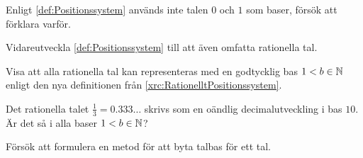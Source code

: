 \begin{exercise}\label{xrc:GiltigaTalbaser}
  Enligt \cref{def:Positionssystem} används inte talen \(0\) och \(1\)
  som baser, försök att förklara varför.
\end{exercise}
\begin{exercise}\label{xrc:RationelltPositionssystem}
  Vidareutveckla \cref{def:Positionssystem} till att även
  omfatta rationella tal.
\end{exercise}
\begin{exercise}\label{xrc:KomplettRationelltPositionssystem}
  Visa att alla rationella tal kan representeras med en godtycklig bas
  \(1<b\in\mathbb{N}\) enligt den nya definitionen från
  \cref{xrc:RationelltPositionssystem}.
\end{exercise}
\begin{exercise}\label{xrc:Decimalfoljder}
  Det rationella talet \(\frac{1}{3} = 0.333\ldots\) skrivs som en oändlig
  decimalutveckling i bas \(10\).
  Är det så i alla baser \(1<b\in\mathbb{N}\)?
\end{exercise}
\begin{exercise}\label{xrc:Basbyte}
  Försök att formulera en metod för att byta talbas för ett tal.
\end{exercise}


